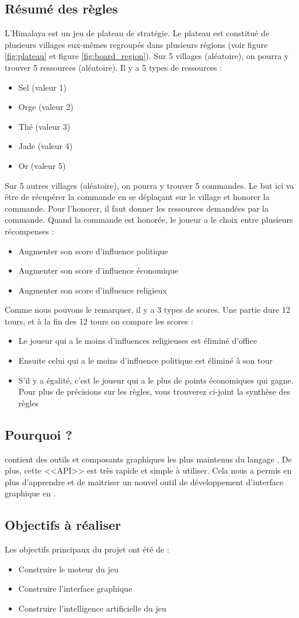 \subsection{Résumé des règles}
L’Himalaya est un jeu de plateau de stratégie. Le plateau est constitué de plusieurs villages eux-mêmes regroupés dans plusieurs régions (voir figure \ref{fig:plateau} et figure \ref{fig:board_region}). Sur 5 villages (aléatoire), on pourra y trouver 5 ressources (aléatoire). Il y a 5 types de ressources : 
\begin{itemize}
	\item Sel (valeur 1)
	\item Orge (valeur 2)
	\item Thé (valeur 3)
	\item Jade (valeur 4)
	\item Or (valeur 5)
\end{itemize}
Sur 5 autres villages (aléatoire), on pourra y trouver 5 commandes. Le but ici va être de récupérer la commande en se déplaçant sur le village et honorer la commande. Pour l’honorer, il faut donner les ressources demandées par la commande. Quand la commande est honorée, le joueur a le choix entre plusieurs récompenses : 
\begin{itemize}
	\item Augmenter son score d’influence politique
	\item Augmenter son score d’influence économique
	\item Augmenter son score d’influence religieux 
\end{itemize}
Comme nous pouvons le remarquer, il y a 3 types de scores. Une partie dure 12 tours, et à la fin des 12 tours on compare les scores : 
\begin{itemize}
	\item Le joueur qui a le moins d’influences religieuses est éliminé d’office
	\item Ensuite celui qui a le moins d’influence politique est éliminé à son tour
	\item S’il y a égalité, c’est le joueur qui a le plus de points économiques qui gagne. Pour plus de précisions sur les règles, vous trouverez ci-joint la synthèse des règles 
\end{itemize}

\subsection{Pourquoi \fx ?}
\fx contient des outils et composants graphiques les plus maintenus du langage \java.
De plus, cette <<API>> est très rapide et simple à utiliser.
Cela nous a permis en plus d’apprendre et de maitriser un nouvel outil de développement d’interface graphique en \java.

\subsection{Objectifs à réaliser}
Les objectifs principaux du projet ont été de :
\begin{itemize} 
	\item Construire le moteur du jeu
	\item Construire l'interface graphique
	\item Construire l’intelligence artificielle du jeu
\end{itemize}

